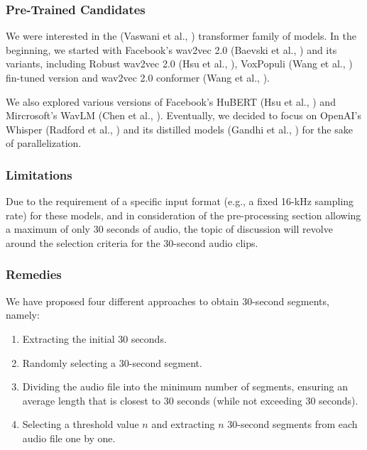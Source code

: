 \documentclass[journal]{IEEEtran}
\begin{document}
\subsubsection{Pre-Trained Candidates}

We were interested in the (Vaswani et al., \cite{vaswani2023attention}) transformer family of models. In the beginning, we started with Facebook's wav2vec 2.0 (Baevski et al., \cite{baevski2020wav2vec}) and its variants, including Robust
wav2vec 2.0 (Hsu et al., \cite{hsu2021robust}), VoxPopuli (Wang et al., \cite{wang2021voxpopuli}) fin-tuned version and wav2vec 2.0 conformer (Wang et al., \cite{wang2022fairseq}).

We also explored various versions of Facebook's HuBERT (Hsu et al., \cite{hsu2021hubert}) and Mircrosoft's WavLM (Chen et al., \cite{Chen_2022}). Eventually, we decided to focus on OpenAI's Whisper (Radford et al., \cite{radford2022robust}) and its distilled models (Gandhi et al., \cite{gandhi2023distilwhisper}) for the sake of parallelization.

\subsubsection{Limitations}

Due to the requirement of a specific input format (e.g., a fixed 16-kHz sampling rate) for these models, and in consideration of the pre-processing section allowing a maximum of only 30 seconds of audio, the topic of discussion will revolve around the selection criteria for the 30-second audio clips.

\subsubsection{Remedies}

We have proposed four different approaches to obtain 30-second segments, namely:

\begin{enumerate}
    \item Extracting the initial 30 seconds.
    \item Randomly selecting a 30-second segment.
    \item Dividing the audio file into the minimum number of segments, ensuring an average length that is closest to 30 seconds (while not exceeding 30 seconds).
    \item Selecting a threshold value $n$ and extracting $n$ 30-second segments from each audio file one by one.
\end{enumerate}
\end{document}
